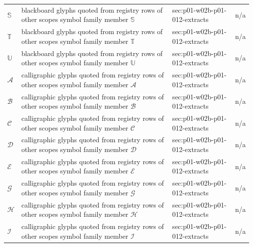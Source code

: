 \begin{longtable}{@{}p{}p{}p{}p{}@{}}
\(\mathbb S\) & blackboard glyphs quoted from registry rows of other scopes symbol family member \(\mathbb S\) & sec:\allowbreak{}p01-\allowbreak{}w02b-\allowbreak{}p01-\allowbreak{}012-\allowbreak{}extracts & n/a \\
\(\mathbb T\) & blackboard glyphs quoted from registry rows of other scopes symbol family member \(\mathbb T\) & sec:\allowbreak{}p01-\allowbreak{}w02b-\allowbreak{}p01-\allowbreak{}012-\allowbreak{}extracts & n/a \\
\(\mathbb U\) & blackboard glyphs quoted from registry rows of other scopes symbol family member \(\mathbb U\) & sec:\allowbreak{}p01-\allowbreak{}w02b-\allowbreak{}p01-\allowbreak{}012-\allowbreak{}extracts & n/a \\
\(\mathcal A\) & calligraphic glyphs quoted from registry rows of other scopes symbol family member \(\mathcal A\) & sec:\allowbreak{}p01-\allowbreak{}w02b-\allowbreak{}p01-\allowbreak{}012-\allowbreak{}extracts & n/a \\
\(\mathcal B\) & calligraphic glyphs quoted from registry rows of other scopes symbol family member \(\mathcal B\) & sec:\allowbreak{}p01-\allowbreak{}w02b-\allowbreak{}p01-\allowbreak{}012-\allowbreak{}extracts & n/a \\
\(\mathcal C\) & calligraphic glyphs quoted from registry rows of other scopes symbol family member \(\mathcal C\) & sec:\allowbreak{}p01-\allowbreak{}w02b-\allowbreak{}p01-\allowbreak{}012-\allowbreak{}extracts & n/a \\
\(\mathcal D\) & calligraphic glyphs quoted from registry rows of other scopes symbol family member \(\mathcal D\) & sec:\allowbreak{}p01-\allowbreak{}w02b-\allowbreak{}p01-\allowbreak{}012-\allowbreak{}extracts & n/a \\
\(\mathcal E\) & calligraphic glyphs quoted from registry rows of other scopes symbol family member \(\mathcal E\) & sec:\allowbreak{}p01-\allowbreak{}w02b-\allowbreak{}p01-\allowbreak{}012-\allowbreak{}extracts & n/a \\
\(\mathcal G\) & calligraphic glyphs quoted from registry rows of other scopes symbol family member \(\mathcal G\) & sec:\allowbreak{}p01-\allowbreak{}w02b-\allowbreak{}p01-\allowbreak{}012-\allowbreak{}extracts & n/a \\
\(\mathcal H\) & calligraphic glyphs quoted from registry rows of other scopes symbol family member \(\mathcal H\) & sec:\allowbreak{}p01-\allowbreak{}w02b-\allowbreak{}p01-\allowbreak{}012-\allowbreak{}extracts & n/a \\
\(\mathcal I\) & calligraphic glyphs quoted from registry rows of other scopes symbol family member \(\mathcal I\) & sec:\allowbreak{}p01-\allowbreak{}w02b-\allowbreak{}p01-\allowbreak{}012-\allowbreak{}extracts & n/a \\

\end{longtable}
